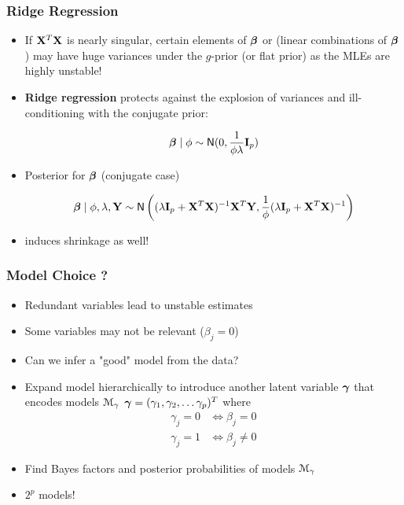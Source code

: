 \documentclass[]{beamer}
\begin{document}
\begin{frame}\frametitle{Ridge Regression}

\begin{itemize}

\item If $\mathbf{X}^T\mathbf{X}$ is nearly singular, certain  elements of $\boldsymbol{\beta}$ or (linear combinations of $\boldsymbol{\beta}$) may have huge variances under the $g$-prior (or flat prior) as the MLEs are highly unstable!


\item {\bf Ridge regression} protects against the explosion of variances and ill-conditioning with the conjugate prior:

$$\boldsymbol{\beta} \mid \phi \sim \textsf{N}(0, \frac{1}{\phi \lambda} \mathbf{I}_p)$$

\item Posterior for $\boldsymbol{\beta}$  (conjugate case)

$$\boldsymbol{\beta} \mid \phi, \lambda, \mathbf{Y} \sim \textsf{N} \left((\lambda \mathbf{I}_p + \mathbf{X}^T\mathbf{X})^{-1} \mathbf{X}^T \mathbf{Y},  \frac{1}{\phi}(\lambda \mathbf{I}_p + \mathbf{X}^T\mathbf{X})^{-1}\right)$$

\item induces shrinkage as well!
\end{itemize}
\end{frame}

\begin{frame} \frametitle{Model Choice ?}
\begin{itemize}
  \item Redundant variables lead to unstable estimates \pause
  \item Some variables may not be relevant ($\beta_j = 0$) \pause
  \item Can we infer a "good" model from the data?
  \item Expand model hierarchically to introduce another latent variable $\boldsymbol{\gamma}$ that encodes models ${\cal M}_\gamma$
  $\boldsymbol{\gamma} = (\gamma_1, \gamma_2, \ldots \gamma_p)^T$ where
  \begin{align*}
  \gamma_j = 0 & \Leftrightarrow \beta_j = 0 \\
  \gamma_j = 1 &  \Leftrightarrow \beta_j \neq 0 
  \end{align*}
  \item Find Bayes factors and posterior probabilities of models ${\cal M}_\gamma$
  \item $2^p$ models!
  
  
  
\end{itemize}


\end{frame}
\end{document}
